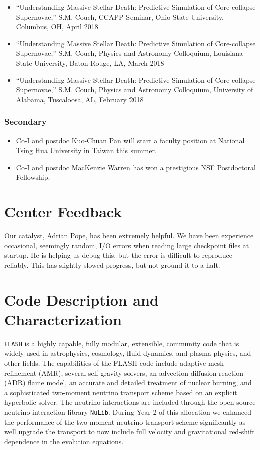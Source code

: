 \documentclass[12pt,titlepage]{article}
\begin{document}

\begin{itemize}
  \item ``Understanding Massive Stellar Death: Predictive Simulation of Core-collapse Supernovae,'' S.M. Couch, CCAPP Seminar, Ohio State University, Columbus, OH, April 2018
  \item ``Understanding Massive Stellar Death: Predictive Simulation of Core-collapse Supernovae,'' S.M. Couch, Physics and Astronomy Colloquium, Louisiana State University, Baton Rouge, LA, March 2018
  \item ``Understanding Massive Stellar Death: Predictive Simulation of Core-collapse Supernovae,'' S.M. Couch, Physics and Astronomy Colloquium, University of Alabama, Tuscaloosa, AL, February 2018
\end{itemize}

\subsubsection{Secondary}

\begin{itemize}
  \item Co-I and postdoc Kuo-Chuan Pan will start a faculty position at National Tsing Hua University in Taiwan this summer.
  \item Co-I and postdoc MacKenzie Warren has won a prestigious NSF Postdoctoral Fellowship.
\end{itemize}

\section{Center Feedback}

Our catalyst, Adrian Pope, has been extremely helpful.
We have been experience occasional, seemingly random, I/O errors when reading large checkpoint files at startup.
He is helping us debug this, but the error is difficult to reproduce reliably.
This has slightly slowed progress, but not ground it to a halt.


\section{Code Description and Characterization}

\texttt{FLASH} is a highly capable, fully modular, extensible,
community code that is widely used in astrophysics, cosmology, fluid
dynamics, and plasma physics, and other fields.  The capabilities of
the FLASH code include adaptive mesh refinement (AMR), several
self-gravity solvers, an advection-diffusion-reaction (ADR) flame
model, an accurate and detailed treatment of nuclear burning, and a
sophisticated two-moment neutrino transport scheme based on an
explicit hyperbolic solver.  The neutrino interactions are included
through the open-source neutrino interaction library
\texttt{NuLib}. During Year 2 of this allocation we enhanced the
performance of the two-moment neutrino transport scheme significantly
as well upgrade the transport to now include full velocity and
gravitational red-shift dependence in the evolution equations.
\end{document}
